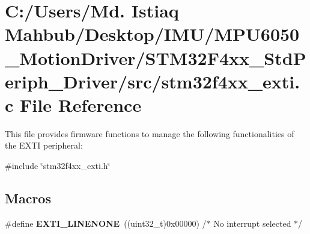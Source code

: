 \section{C\+:/\+Users/\+Md. Istiaq Mahbub/\+Desktop/\+I\+M\+U/\+M\+P\+U6050\+\_\+\+Motion\+Driver/\+S\+T\+M32\+F4xx\+\_\+\+Std\+Periph\+\_\+\+Driver/src/stm32f4xx\+\_\+exti.c File Reference}
\label{stm32f4xx__exti_8c}


This file provides firmware functions to manage the following functionalities of the E\+X\+TI peripheral\+:  


{\ttfamily \#include \char`\"{}stm32f4xx\+\_\+exti.\+h\char`\"{}}\newline
\subsection*{Macros}
\begin{DoxyCompactItemize}
\item 
\#define \textbf{ E\+X\+T\+I\+\_\+\+L\+I\+N\+E\+N\+O\+NE}~((uint32\+\_\+t)0x00000)  /$\ast$ No interrupt selected $\ast$/
\end{DoxyCompactItemize}
